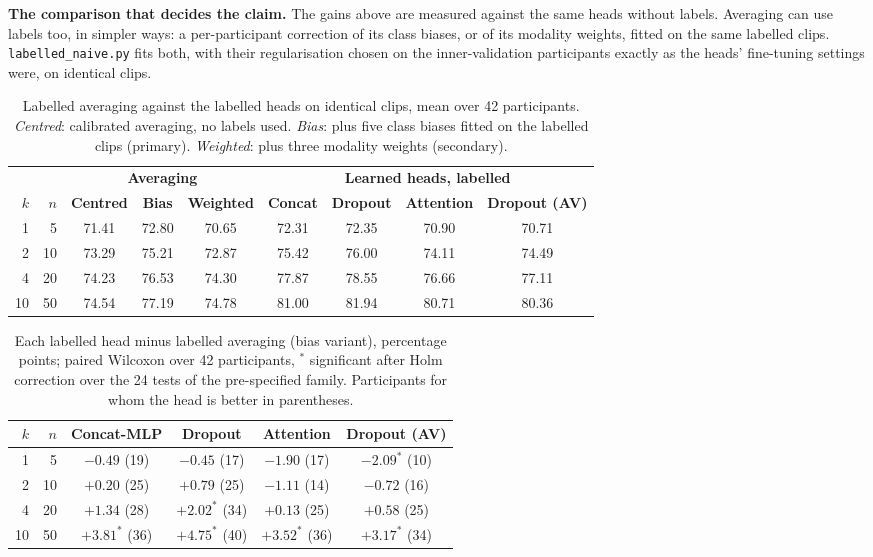 \textbf{The comparison that decides the claim.} The gains above are measured against
the same heads without labels. Averaging can use labels too, in simpler ways: a
per-participant correction of its class biases, or of its modality weights, fitted on
the same labelled clips. \texttt{labelled\_naive.py} fits both, with their regularisation
chosen on the inner-validation participants exactly as the heads' fine-tuning settings
were, on identical clips.

\begin{table}[htbp]
\centering
\small
\caption{Labelled averaging against the labelled heads on identical clips, mean over 42
participants. \emph{Centred}: calibrated averaging, no labels used. \emph{Bias}: plus
five class biases fitted on the labelled clips (primary). \emph{Weighted}: plus three
modality weights (secondary).}
\label{tab:cal_labelled_naive}
\begin{tabular}{rrccccccc}
\hline
& & \multicolumn{3}{c}{\textbf{Averaging}} & \multicolumn{4}{c}{\textbf{Learned heads, labelled}} \\
\textbf{$k$} & \textbf{$n$} & \textbf{Centred} & \textbf{Bias} & \textbf{Weighted} & \textbf{Concat} & \textbf{Dropout} & \textbf{Attention} & \textbf{Dropout (AV)} \\
\hline
1  & 5  & 71.41 & 72.80 & 70.65 & 72.31 & 72.35 & 70.90 & 70.71 \\
2  & 10 & 73.29 & 75.21 & 72.87 & 75.42 & 76.00 & 74.11 & 74.49 \\
4  & 20 & 74.23 & 76.53 & 74.30 & 77.87 & 78.55 & 76.66 & 77.11 \\
10 & 50 & 74.54 & 77.19 & 74.78 & 81.00 & 81.94 & 80.71 & 80.36 \\
\hline
\end{tabular}
\end{table}

\begin{table}[htbp]
\centering
\small
\caption{Each labelled head minus labelled averaging (bias variant), percentage points;
paired Wilcoxon over 42 participants, $^{*}$ significant after Holm correction over the
24 tests of the pre-specified family. Participants for whom the head is better in
parentheses.}
\label{tab:cal_labelled_naive_tests}
\begin{tabular}{rrcccc}
\hline
\textbf{$k$} & \textbf{$n$} & \textbf{Concat-MLP} & \textbf{Dropout} & \textbf{Attention} & \textbf{Dropout (AV)} \\
\hline
1  & 5  & $-0.49$ (19)      & $-0.45$ (17)      & $-1.90$ (17)      & $-2.09^{*}$ (10) \\
2  & 10 & $+0.20$ (25)      & $+0.79$ (25)      & $-1.11$ (14)      & $-0.72$ (16) \\
4  & 20 & $+1.34$ (28)      & $+2.02^{*}$ (34)  & $+0.13$ (25)      & $+0.58$ (25) \\
10 & 50 & $+3.81^{*}$ (36)  & $+4.75^{*}$ (40)  & $+3.52^{*}$ (36)  & $+3.17^{*}$ (34) \\
\hline
\end{tabular}
\end{table}

